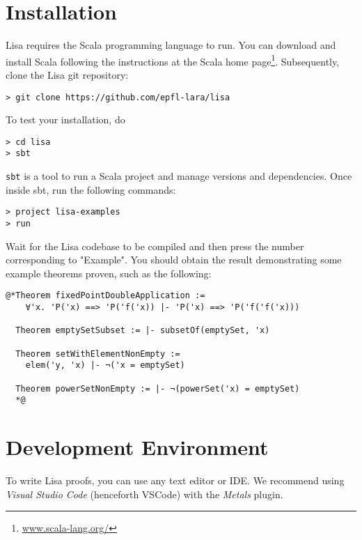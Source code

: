 \section{Installation}
Lisa requires the Scala programming language to run. You can download and install Scala following the instructions at the Scala home page\footnote{\url{www.scala-lang.org/}}. Subsequently, clone the Lisa git repository:
\begin{lstlisting}[language=console]
> git clone https://github.com/epfl-lara/lisa
\end{lstlisting}
To test your installation, do
\begin{lstlisting}[language=console]
> cd lisa
> sbt
\end{lstlisting}
\lstinline|sbt| is a tool to run a Scala project and manage versions and dependencies. Once inside sbt, run the following commands:
\begin{lstlisting}[language=console]
> project lisa-examples
> run
\end{lstlisting}
Wait for the Lisa codebase to be compiled and then press the number corresponding to "Example". You should obtain the result demonstrating some example theorems proven, such as the following:

\noindent\begin{minipage}{\linewidth}\vspace{1em}
\begin{lstlisting}[language=console]
  @*Theorem fixedPointDoubleApplication := 
    ∀'x. 'P('x) ==> 'P('f('x)) |- 'P('x) ==> 'P('f('f('x)))

  Theorem emptySetSubset := |- subsetOf(emptySet, 'x)

  Theorem setWithElementNonEmpty := 
    elem('y, 'x) |- ¬('x = emptySet)

  Theorem powerSetNonEmpty := |- ¬(powerSet('x) = emptySet)
  *@
\end{lstlisting}
\end{minipage}

\section{Development Environment}
To write Lisa proofs, you can use any text editor or IDE. We recommend using \emph{Visual Studio Code} (henceforth VSCode) with the \emph{Metals} plugin.

